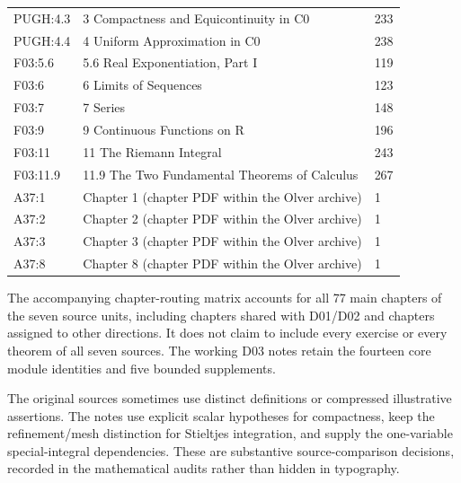 \begin{longtable}{p{22mm}p{99mm}p{20mm}}
PUGH:4.3 & 3 Compactness and Equicontinuity in C0 & 233 \\

PUGH:4.4 & 4 Uniform Approximation in C0 & 238 \\

F03:5.6 & 5.6 Real Exponentiation, Part I & 119 \\

F03:6 & 6 Limits of Sequences & 123 \\

F03:7 & 7 Series & 148 \\

F03:9 & 9 Continuous Functions on R & 196 \\

F03:11 & 11 The Riemann Integral & 243 \\

F03:11.9 & 11.9 The Two Fundamental Theorems of Calculus & 267 \\

A37:1 & Chapter 1 (chapter PDF within the Olver archive) & 1 \\

A37:2 & Chapter 2 (chapter PDF within the Olver archive) & 1 \\

A37:3 & Chapter 3 (chapter PDF within the Olver archive) & 1 \\

A37:8 & Chapter 8 (chapter PDF within the Olver archive) & 1 \\

\bottomrule\end{longtable}\normalsize

The accompanying chapter-routing matrix accounts for all 77 main chapters of the seven source units, including chapters shared with D01/D02 and chapters assigned to other directions. It does not claim to include every exercise or every theorem of all seven sources. The working D03 notes retain the fourteen core module identities and five bounded supplements.

The original sources sometimes use distinct definitions or compressed illustrative assertions. The notes use explicit scalar hypotheses for compactness, keep the refinement/mesh distinction for Stieltjes integration, and supply the one-variable special-integral dependencies. These are substantive source-comparison decisions, recorded in the mathematical audits rather than hidden in typography.
